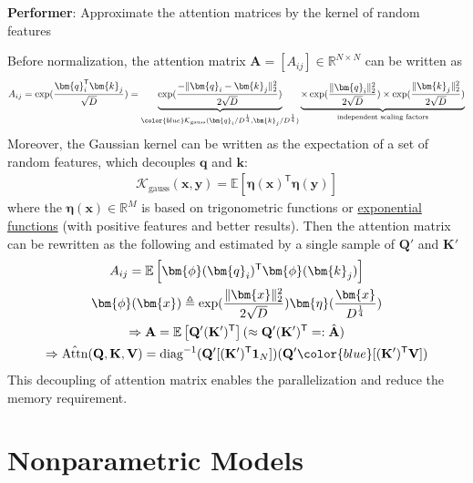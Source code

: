 \begin{example}
    \textbf{Performer}: Approximate the attention matrices by the kernel of random features

    Before normalization, the attention matrix $\mathbf{A}=[A_{ij}]\in\mathbb{R}^{N\times N}$ can be written as 
    \begin{gather}
        A_{ij}=\exp(\frac{\bm{q}_i^\mathsf{T}\bm{k}_j}{\sqrt{D}})
        = \underbrace{\exp(\frac{-\|\bm{q}_i-\bm{k}_j\|_2^2}{2\sqrt{D}})}_{\color{blue}\mathcal{K}_\text{gauss}(\bm{q}_i/D^{\frac{1}{4}},\bm{k}_j/D^{\frac{1}{4}})}
        \underbrace{\times \exp(\frac{\|\bm{q}_i\|_2^2}{2\sqrt{D}})
        \times \exp(\frac{\|\bm{k}_j\|_2^2}{2\sqrt{D}})}_\text{independent scaling factors}
    \end{gather}
    Moreover, the Gaussian kernel can be written as the expectation of a set of random features, which decouples $\bm{q}$ and $\bm{k}$:
    \begin{gather}
        \mathcal{K}_\text{gauss}(\bm{x},\bm{y})
        = \mathbb{E}\left[\bm{\eta}(\bm{x})^\mathsf{T}\bm{\eta}(\bm{y})\right]
    \end{gather}
    where the $\bm{\eta}(\bm{x})\in\mathbb{R}^M$ is based on trigonometric functions or \uline{exponential functions} 
    (with positive features and better results).
    Then the attention matrix can be rewritten as the following and estimated by a single sample of $\mathbf{Q}'$ and $\mathbf{K}'$
    \begin{gather}
        A_{ij}=\mathbb{E}\left[\bm{\phi}(\bm{q}_i)^\mathsf{T}\bm{\phi}(\bm{k}_j)\right] \\
        \bm{\phi}(\bm{x})\triangleq\exp(\frac{\|\bm{x}\|_2^2}{2\sqrt{D}})\bm{\eta}(\frac{\bm{x}}{D^\frac{1}{4}}) \\
        \Rightarrow
        \mathbf{A}=\mathbb{E}\left[\mathbf{Q}'(\mathbf{K}')^\mathsf{T}\right](\approx\mathbf{Q}'(\mathbf{K}')^\mathsf{T}=:\hat{\mathbf{A}}) \\
        \Rightarrow
        \hat{\mathrm{Attn}}(\mathbf{Q},\mathbf{K},\mathbf{V})=\mathrm{diag}^{-1}(\mathbf{Q}'[(\mathbf{K}')^\mathsf{T}\mathbf{1}_N])(\mathbf{Q}'{\color{blue}[(\mathbf{K}')^\mathsf{T}\mathbf{V}]})
    \end{gather}
    This decoupling of attention matrix enables the parallelization and reduce the memory requirement.
\end{example}




\section{Nonparametric Models}

